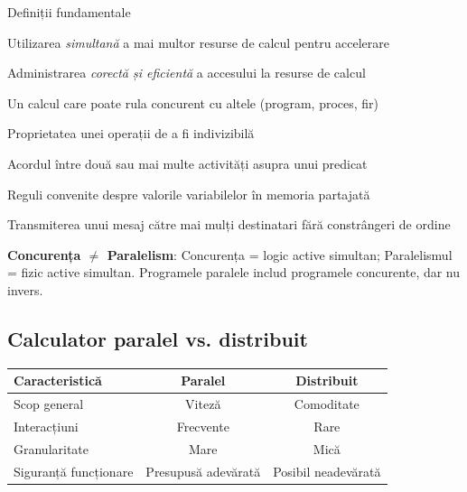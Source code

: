 \documentclass[a4paper,11pt]{article}
\newcommand{\thead}[1]{\cellcolor{tblheader}\color{white}\textbf{#1}}
\begin{document}
\begin{defbox}{Definiții fundamentale}
\begin{description}[leftmargin=3cm, style=nextline, noitemsep]
  \item[\textbf{Paralelism}] Utilizarea \emph{simultană} a mai multor resurse de calcul pentru accelerare
  \item[\textbf{Concurență}] Administrarea \emph{corectă și eficientă} a accesului la resurse de calcul
  \item[\textbf{Task/Activitate}] Un calcul care poate rula concurent cu altele (program, proces, fir)
  \item[\textbf{Atomicitate}] Proprietatea unei operații de a fi indivizibilă
  \item[\textbf{Consensus}] Acordul între două sau mai multe activități asupra unui predicat
  \item[\textbf{Consistență}] Reguli convenite despre valorile variabilelor în memoria partajată
  \item[\textbf{Multicast}] Transmiterea unui mesaj către mai mulți destinatari fără constrângeri de ordine
\end{description}
\end{defbox}

\begin{tipbox}
\textbf{Concurența $\neq$ Paralelism}: Concurența = logic active simultan; Paralelismul = fizic active simultan.
Programele paralele includ programele concurente, dar nu invers.
\end{tipbox}

\subsection{Calculator paralel vs. distribuit}

\begin{center}
\begin{tabular}{lcc}
\toprule
\thead{Caracteristică} & \thead{Paralel} & \thead{Distribuit} \\
\midrule
Scop general & Viteză & Comoditate \\
Interacțiuni & Frecvente & Rare \\
Granularitate & Mare & Mică \\
Siguranță funcționare & Presupusă adevărată & Posibil neadevărată \\
\bottomrule
\end{tabular}
\end{center}
\end{document}
